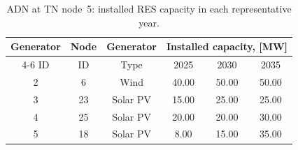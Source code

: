 \begin{table}[htbp!]
    \centering
    \caption{ADN at TN node~5: installed RES capacity in each representative year.}
    \begin{tabular}{ccc ccc}
        \toprule
        Generator   & Node  & Generator & \multicolumn{3}{c}{Installed capacity, [MW]}\\  \cmidrule{4-6}
        ID          & ID    & Type      & 2025 & 2030 & 2035 \\ 
        \midrule
        2 & 6 & Wind & 40.00 & 50.00 & 50.00\\
        3 & 23 & Solar PV & 15.00 & 25.00 & 25.00\\
        4 & 25 & Solar PV & 20.00 & 20.00 & 30.00\\
        5 & 18 & Solar PV & 8.00 & 15.00 & 35.00\\
        \bottomrule
    \end{tabular}
    \label{tab:cs3_adn_node_5_res_generators}
\end{table}
